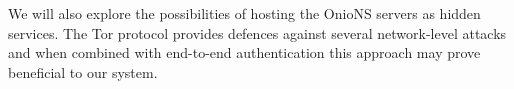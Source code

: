 \documentclass[conference]{IEEEtran}
\begin{document}
We will also explore the possibilities of hosting the OnioNS servers as hidden services. The Tor protocol provides defences against several network-level attacks and when combined with end-to-end authentication this approach may prove beneficial to our system.












%
%
\end{document}
